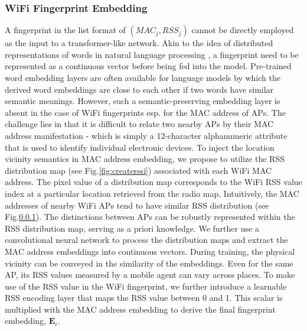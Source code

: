 \subsubsection{WiFi Fingerprint Embedding}
A fingerprint in the list format of $(MAC_j, RSS_j)$ cannot be directly employed as the input to a transformer-like network. 
Akin to the idea of distributed representations of words in natural language processing \cite{mikolov2013efficient}, 
a fingerprint need to be represented as a continuous vector before being fed into the model. 
Pre-trained word embedding layers are often available for language models by which the derived word embeddings are close to each other if two words have similar semantic meanings. 
However, such a semantic-preserving embedding layer is absent in the case of WiFi fingerprints esp. for the MAC address of APs. The challenge lies in that it is difficult to relate two nearby APs by their MAC address manifestation - which is simply a 12-character alphanumeric attribute that is used to identify individual electronic devices. To inject the location vicinity semantics in MAC address embedding, we propose to utilize the RSS distribution map (see Fig.\ref{fig:createrssi}) associated with each WiFi MAC address. The pixel value of a distribution map corresponds to the WiFi RSS value index at a particular location retrieved from the radio map. 
Intuitively, the MAC addresses of nearby WiFi APs tend to have similar RSS distribution (see Fig.\ref{}). 
The distinctions between APs can be robustly represented within the RSS distribution map, serving as a priori knowledge.
We further use a convolutional neural network to process the distribution maps and extract the MAC address embeddings into continuous vectors. 
During training, the physical vicinity can be conveyed in the similarity of the embeddings. Even for the same AP, its RSS values measured by a mobile agent can vary across places. 
To make use of the RSS value in the WiFi fingerprint,  we further introduce a learnable RSS encoding layer that maps the RSS value  between 0 and 1.  This scalar is multiplied with the MAC address embedding to derive the final fingerprint embedding, $\mathbf{E}_i$.  


